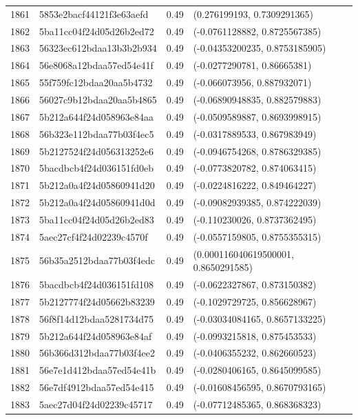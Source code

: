 \begin{table}[ht]
\begin{tabular}{rlrl}
  1861 & 5853e2bacf44121f3e63aefd & 0.49 & (0.276199193, 0.7309291365) \\ 
  1862 & 5ba11cc04f24d05d26b2ed72 & 0.49 & (-0.0761128882, 0.8725567385) \\ 
  1863 & 56323ec612bdaa13b3b2b934 & 0.49 & (-0.04353200235, 0.8753185905) \\ 
  1864 & 56e8068a12bdaa57ed54e41f & 0.49 & (-0.0277290781, 0.86665381) \\ 
  1865 & 55f759fc12bdaa20aa5b4732 & 0.49 & (-0.066073956, 0.887932071) \\ 
  1866 & 56027c9b12bdaa20aa5b4865 & 0.49 & (-0.06890948835, 0.882579883) \\ 
  1867 & 5b212a644f24d058963e84aa & 0.49 & (-0.0509589887, 0.8693998915) \\ 
  1868 & 56b323e112bdaa77b03f4ec5 & 0.49 & (-0.0317889533, 0.867983949) \\ 
  1869 & 5b2127524f24d056313252e6 & 0.49 & (-0.0946754268, 0.8786329385) \\ 
  1870 & 5bacdbcb4f24d036151fd0eb & 0.49 & (-0.0773820782, 0.874063415) \\ 
  1871 & 5b212a0a4f24d05860941d20 & 0.49 & (-0.0224816222, 0.849464227) \\ 
  1872 & 5b212a0a4f24d05860941d0d & 0.49 & (-0.09082939385, 0.874222039) \\ 
  1873 & 5ba11cc04f24d05d26b2ed83 & 0.49 & (-0.110230026, 0.8737362495) \\ 
  1874 & 5aec27cf4f24d02239c4570f & 0.49 & (-0.0557159805, 0.8755355315) \\ 
  1875 & 56b35a2512bdaa77b03f4edc & 0.49 & (0.000116040619500001, 0.8650291585) \\ 
  1876 & 5bacdbcb4f24d036151fd108 & 0.49 & (-0.0622327867, 0.873150382) \\ 
  1877 & 5b2127774f24d05662b83239 & 0.49 & (-0.1029729725, 0.856628967) \\ 
  1878 & 56f8f14d12bdaa5281734d75 & 0.49 & (-0.03034084165, 0.8657133225) \\ 
  1879 & 5b212a644f24d058963e84af & 0.49 & (-0.0993215818, 0.875453533) \\ 
  1880 & 56b366d312bdaa77b03f4ee2 & 0.49 & (-0.0406355232, 0.862660523) \\ 
  1881 & 56e7e1d412bdaa57ed54e41b & 0.49 & (-0.0280406165, 0.8645099585) \\ 
  1882 & 56e7df4912bdaa57ed54e415 & 0.49 & (-0.01608456595, 0.8670793165) \\ 
  1883 & 5aec27d04f24d02239c45717 & 0.49 & (-0.07712485365, 0.868368323) \\ 

\end{tabular}
\end{table}
